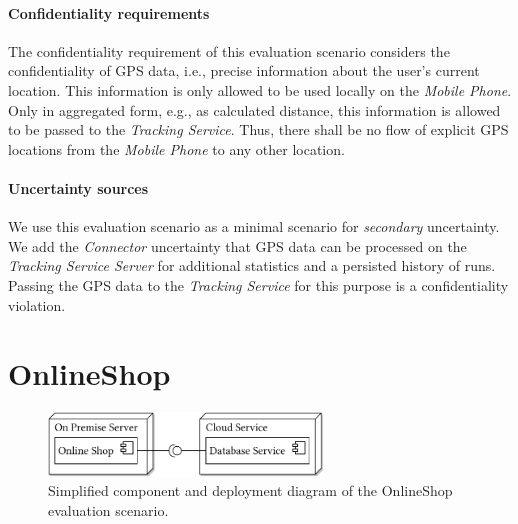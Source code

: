 \paragraph{Confidentiality requirements}
The confidentiality requirement of this evaluation scenario considers the confidentiality of GPS data, i.e., precise information about the user's current location.
This information is only allowed to be used locally on the \emph{Mobile Phone}.
Only in aggregated form, e.g., as calculated distance, this information is allowed to be passed to the \emph{Tracking Service}.
Thus, there shall be no flow of explicit GPS locations from the \emph{Mobile Phone} to any other location.

\paragraph{Uncertainty sources}
We use this evaluation scenario as a minimal scenario for \emph{secondary} uncertainty.
We add the \emph{Connector} uncertainty that GPS data can be processed on the \emph{Tracking Service Server} \cite{hahner_model-based_2023} for additional statistics and a persisted history of runs.
Passing the GPS data to the \emph{Tracking Service} for this purpose is a confidentiality violation.





\section{OnlineShop}%
\label{sec:evaluationscenarios:onlineshop}

\begin{figure}
    \centering
    \includegraphics[width=0.65\textwidth]{figures/chapter8/scenario3_onlineshop.pdf}
    \caption{Simplified component and deployment diagram of the OnlineShop evaluation scenario.}
    \label{fig:evaluationscenarios:onlineshop}
\end{figure}

